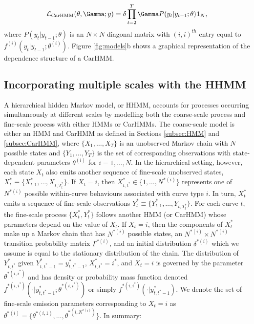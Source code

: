 \begin{equation*}
    \calL_{\text{CarHMM}}(\theta,\Gamma;y) = \delta \prod_{t=2}^T \Gamma P(y_t|y_{t-1};\theta) \mathbf{1}_N,
    \label{eqn:CarHMM_likelihood}
\end{equation*}
where
%
$P(y_t|y_{t-1};\theta)$ is an $N \times N$ diagonal matrix with $(i,i)^{th}$ entry equal to $f^{(i)}(y_t|y_{t-1}; \theta^{(i)})$. Figure \ref{fig:models}b shows a graphical representation of the dependence structure of a CarHMM. 

\subsection{Incorporating multiple scales with the HHMM}
\label{subsec:HHMM}

A hierarchical hidden Markov model, or HHMM, accounts for processes occurring simultaneously at different scales by modelling both the coarse-scale process and fine-scale process with either HMMs \citep{Barajas:2017,Adam:2019} or CarHMMs. The coarse-scale model is either an HMM and CarHMM as defined in Sections \ref{subsec:HMM} and \ref{subsec:CarHMM}, where $\{X_1, \ldots, X_T\}$ is an unobserved Markov chain with $N$ possible states and $\{Y_1, \ldots, Y_T\}$ is the set of corresponding observations with state-dependent parameters $\theta^{(i)}$ for $i = 1,\ldots,N$.   
%
In the hierarchical setting, however, each state $X_t$ also emits another sequence of fine-scale unobserved states, $X^*_t \equiv \{X_{t,1}^*,\ldots, X_{t,T_t^*}\}$. If $X_t = i$, then $X^*_{t,t^*} \in \{1,\ldots,N^{*(i)}\}$ represents one of $N^{*(i)}$ possible within-curve behaviours associated with curve type $i$. In turn, $X^*_t$ emits a sequence of fine-scale observations $Y^*_t \equiv \{Y_{t,1}^*,\ldots, Y_{t,T_t^*}\}$. For each curve $t$, the fine-scale process $\{X^*_t, Y^*_t\}$ follows another HMM (or CarHMM) whose parameters depend on the value of $X_t$. If $X_t = i$, then the components of $X^*_t$ make up a Markov chain that has $N^{*(i)}$ possible states, an $N^{*(i)} \times N^{*(i)}$ transition probability matrix $\Gamma^{*(i)}$, and an initial distribution $\delta^{*(i)}$ which we assume is equal to the stationary distribution of the chain. The distribution of $Y^*_{t,t^*}$ given $Y^*_{t,t^*-1} = y^*_{t,t^*-1}$, $X^*_{t,t^*}=i^*$, and $X_t=i$ is governed by the parameter $\theta^{*(i,i^*)}$ and has density or probability mass function denoted $f^{*(i,i^*)}\left(\cdot|y^*_{t,t^*-1}; \theta^{*(i,i^*)}\right)$ or simply $f^{*(i,i^*)}(\cdot|y^*_{t,t^*-1})$. We denote the set of fine-scale emission parameters corresponding to $X_t=i$ as $\theta^{*(i)}=\big\{\theta^{*(i,1)}, \ldots, \theta^{*\left(i,N^{*(i)}\right)}\big\}$. In summary:

